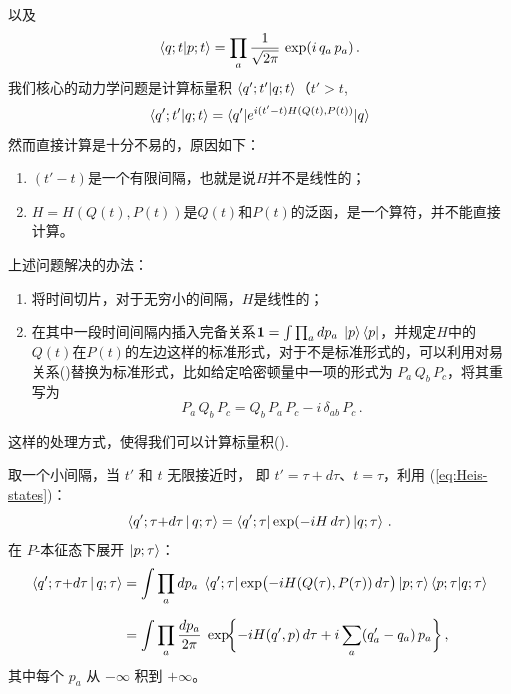 以及
\begin{equation}\label{eq:Heis-qp}
  \braket{q;t|p;t}
  =\prod_a\frac{1}{\sqrt{2\pi}}\,\exp(i\,q_a\,p_a)\,.
\end{equation}
我们核心的动力学问题是计算标量积
$\braket{q';t'|q;t}$（$t'>t$,
\begin{equation}\label{eq:Feynman_k}
  \braket{q';t'|q;t}=\braket{q'|e^{i(t'-t)H(Q(t),P(t))}|q}
\end{equation}
然而直接计算是十分不易的，原因如下：
\begin{enumerate}
  \item $(t'-t)$是一个有限间隔，也就是说$H$并不是线性的；
  \item $H=H(Q(t),P(t))$是$Q(t)$和$P(t)$的泛函，是一个算符，并不能直接计算。
\end{enumerate}
上述问题解决的办法：
\begin{enumerate}
  \item 将时间切片，对于无穷小的间隔，$H$是线性的；
  \item 在其中一段时间间隔内插入完备关系$\mathbf{1} = \int\prod_a dp_a\;\ket{p}\bra{p}$，并规定$H$中的$Q(t)$在$P(t)$的左边这样的标准形式，对于不是标准形式的，可以利用对易关系()替换为标准形式，比如给定哈密顿量中一项的形式为 $P_a\,Q_b\,P_c$，将其重写为
        \[
          P_a\,Q_b\,P_c = Q_b\,P_a\,P_c - i\,\delta_{ab}\,P_c\,.
        \]
\end{enumerate}
这样的处理方式，使得我们可以计算标量积().
\medskip


取一个小间隔，当 $t'$ 和 $t$ 无限接近时，
即 $t'=\tau+d\tau$、$t=\tau$，利用 (\ref{eq:Heis-states})：
\begin{equation}\label{eq:inf-step-0}
  \braket{q';\tau{+}d\tau\,|\,q;\tau}
  =\bra{q';\tau}\exp(-iH\,d\tau)\ket{q;\tau}\,.
\end{equation}
在 $P$-本征态下展开 $\ket{p;\tau}$：
\begin{align}
  \braket{q';\tau{+}d\tau\,|\,q;\tau}
  &= \int\prod_a dp_a\;
    \bra{q';\tau}\exp\bigl(-iH(Q(\tau),P(\tau))\,d\tau\bigr)
    \ket{p;\tau}\braket{p;\tau|q;\tau}
    \notag\\[6pt]
  &= \int\prod_a\frac{dp_a}{2\pi}\;
    \exp\!\biggl\{
      -iH(q',p)\,d\tau
      +i\sum_a(q'_a-q_a)\,p_a
    \biggr\}\,,
    \label{eq:single-step}
\end{align}
其中每个 $p_a$ 从 $-\infty$ 积到 $+\infty$。
\medskip


